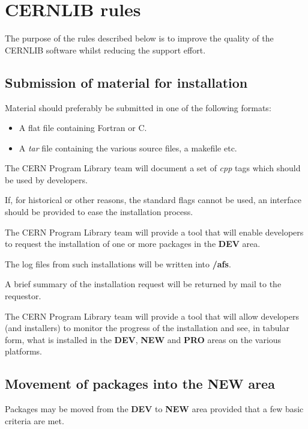 \chapter{CERNLIB rules}
The purpose of the rules described below is to improve
the quality of the CERNLIB software whilst reducing
the support effort.

\section{Submission of material for installation}

Material should preferably be submitted in one of the
following formats:
\begin{itemize}
\item
A flat file containing Fortran or C.
\item
A {\it tar} file containing the various source
files, a makefile etc.
\end{itemize}

The CERN Program Library team will document a set of
{\it cpp} tags which should be used by developers. 

If, for historical or other reasons, the standard flags
cannot be used, an interface should be provided to ease
the installation process.

The CERN Program Library team will provide a tool that
will enable developers to request the installation of
one or more packages in the {\bf DEV} area.

The log files from such installations will be written
into {\bf /afs}.

A brief summary of the installation request will be
returned by mail to the requestor.

The CERN Program Library team will provide a tool that
will allow developers (and installers) to monitor the
progress of the installation and see, in tabular form,
what is installed in the {\bf DEV}, {\bf NEW} and {\bf PRO}
areas on the various platforms.

\section{Movement of packages into the {\bf NEW} area}

Packages may be moved from the {\bf DEV} to {\bf NEW}
area provided that a few basic criteria are met.

